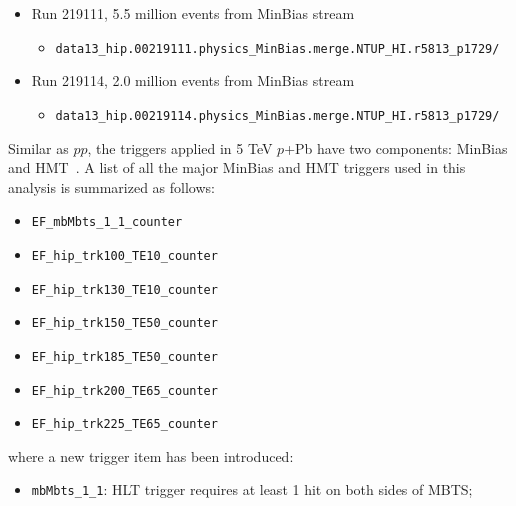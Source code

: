 \begin{itemize}
\item Run 219111, 5.5 million events from MinBias stream
\begin{itemize}[leftmargin=*]
\item[] \verb|data13_hip.00219111.physics_MinBias.merge.NTUP_HI.r5813_p1729/|
\end{itemize}

\item Run 219114, 2.0 million events from MinBias stream
\begin{itemize}[leftmargin=*]
\item[] \verb|data13_hip.00219114.physics_MinBias.merge.NTUP_HI.r5813_p1729/|
\end{itemize}

\end{itemize}

Similar as $pp$, the triggers applied in 5 TeV $p$+Pb have two components: MinBias and HMT~\cite{Aad:2014lta, atlas:3}. A list of all the major MinBias and HMT triggers used in this analysis is summarized as follows:
\begin{itemize}
\item \verb|EF_mbMbts_1_1_counter|
\item \verb|EF_hip_trk100_TE10_counter|
\item \verb|EF_hip_trk130_TE10_counter|
\item \verb|EF_hip_trk150_TE50_counter|
\item \verb|EF_hip_trk185_TE50_counter|
\item \verb|EF_hip_trk200_TE65_counter|
\item \verb|EF_hip_trk225_TE65_counter|
\end{itemize}
where a new trigger item has been introduced:
\begin{itemize}
\item \verb|mbMbts_1_1|: HLT trigger requires at least 1 hit on both sides of MBTS;
\end{itemize}

